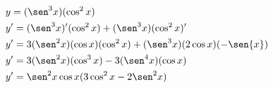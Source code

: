\begin{ex}
\begin{align}
&y=(\sen^3{x})(\cos^2{x})\nonumber\\
&y'=(\sen^3{x})'(\cos^2{x})+(\sen^3{x})(\cos^2{x})'\nonumber\\
&y'=3(\sen^2{x})(\cos{x})(\cos^2{x})+(\sen^3{x})(2\cos{x})(-\sen{x})\nonumber\\
&y'=3(\sen^2{x})(\cos^3{x})-3(\sen^4{x})(\cos{x})\nonumber\\
&y'=\sen^2{x}\cos{x}(3\cos^2{x}-2\sen^2{x})\nonumber
\end{align}
\end{ex}